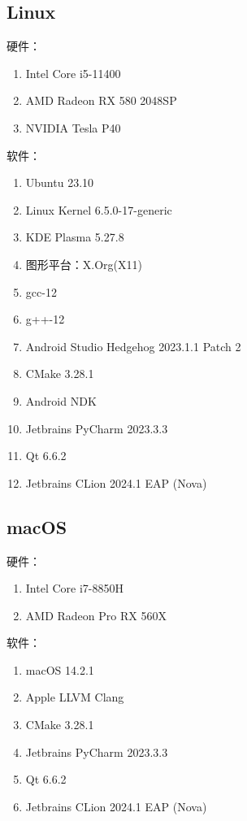 \subsection{Linux}

硬件：
\begin{enumerate}
	\item Intel Core i5-11400
	\item AMD Radeon RX 580 2048SP
	\item NVIDIA Tesla P40
\end{enumerate}

软件：
\begin{enumerate}
	\item Ubuntu 23.10
	\item Linux Kernel 6.5.0-17-generic
	\item KDE Plasma 5.27.8
	\item 图形平台：X.Org(X11)
	\item gcc-12
	\item g++-12
	\item Android Studio Hedgehog 2023.1.1 Patch 2
	\item CMake 3.28.1
	\item Android NDK
	\item Jetbrains PyCharm 2023.3.3
	\item Qt 6.6.2
	\item Jetbrains CLion 2024.1 EAP (Nova)
\end{enumerate}

\subsection{macOS}

硬件：
\begin{enumerate}
	\item Intel Core i7-8850H
	\item AMD Radeon Pro RX 560X
\end{enumerate}

软件：
\begin{enumerate}
	\item macOS 14.2.1
	\item Apple LLVM Clang
	\item CMake 3.28.1
	\item Jetbrains PyCharm 2023.3.3
	\item Qt 6.6.2
	\item Jetbrains CLion 2024.1 EAP (Nova)
\end{enumerate}
